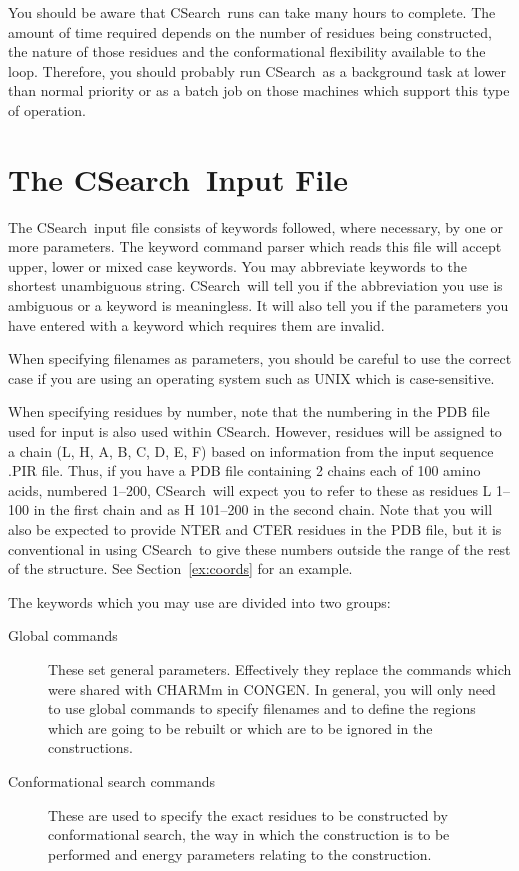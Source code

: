 \documentclass{report}
\newcommand{\cs}{CSearch}
\begin{document}
You should be aware that \cs\ runs can take many hours to complete. The
amount of time required depends on the number of residues being constructed,
the nature of those residues and the conformational flexibility available 
to the loop. Therefore, you should probably run \cs\ as a background task
at lower than normal priority or as a batch job on those machines which
support this type of operation.

\section{The \cs\ Input File}
The \cs\ input file consists of keywords followed, where necessary, by
one or more parameters. The keyword command parser which reads this file
will accept upper, lower or mixed case keywords. You may abbreviate
keywords to the shortest unambiguous string. \cs\ will tell you if the
abbreviation you use is ambiguous or a keyword is meaningless. It will also
tell you if the parameters you have entered with a keyword which requires
them are invalid.

When specifying filenames as parameters, you should be careful to use the
correct case if you are using an operating system such as UNIX which is
case-sensitive.

When specifying residues by number, note that the numbering in the PDB
file used for input is also used within \cs. However, residues will be
assigned to a chain (L, H, A, B, C, D, E, F) based on information from the
input sequence .PIR file. Thus, if you have a PDB file containing 2 chains 
each of 100 amino acids, numbered 1--200, \cs\ will
expect you to refer to these as residues L 1--100 in the first chain and
as H 101--200 in the second chain. Note that you will also be expected to
provide NTER and CTER residues in the PDB file, but it is conventional
in using \cs\ to give these numbers outside the range of the rest of the
structure. See Section~\ref{ex:coords} for an example.

The keywords which you may use are divided into two groups:
\begin{description}
\item[Global commands] These set general parameters. Effectively 
they replace the commands which were shared with CHARMm in CONGEN. In 
general, you will only need to use global commands to specify filenames and
to define the regions which are going to be rebuilt or which are to be
ignored in the constructions.
\item[Conformational search commands] These are used
to specify the exact residues to be constructed by conformational search,
the way in which the construction is to be performed and energy parameters
relating to the construction. 
\end{description}
\end{document}
